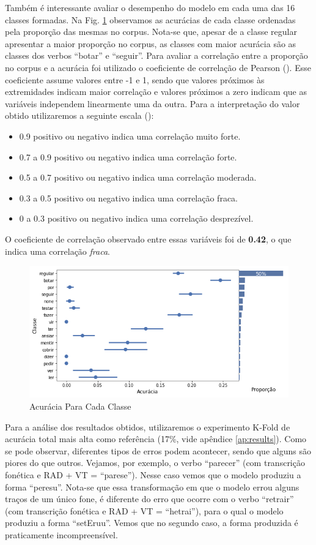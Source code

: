 Também é interessante avaliar o desempenho do modelo em cada uma das 16 classes formadas. Na Fig. \ref{fig:kfoldprop} observamos as acurácias de cada classe ordenadas pela proporção das mesmas no corpus. Nota-se que, apesar de a classe regular apresentar a maior proporção no corpus, as classes com maior acurácia são as classes dos verbos “botar” e “seguir”. Para avaliar a correlação entre a proporção no corpus e a acurácia foi utilizado o coeficiente de correlação de Pearson (\cite{2004:bussab}). Esse coeficiente assume valores entre -1 e 1, sendo que valores próximos às extremidades indicam maior correlação e valores próximos a zero indicam que as variáveis independem linearmente uma da outra. Para a interpretação do valor obtido utilizaremos a seguinte escala (\cite{pearson:1989}):

\begin{itemize}
    \item 0.9 positivo ou negativo indica uma correlação muito forte.
    \item0.7 a 0.9 positivo ou negativo indica uma correlação forte.
    \item0.5 a 0.7 positivo ou negativo indica uma correlação moderada.
    \item0.3 a 0.5 positivo ou negativo indica uma correlação fraca.
    \item0 a 0.3 positivo ou negativo indica uma correlação desprezível.
\end{itemize}

O coeficiente de correlação observado entre essas variáveis foi de \textbf{0.42}, o que indica uma correlação \textit{fraca}. 

\begin{figure}[H]
  \centering
  \includegraphics[width=0.8\linewidth]{img/proporxacc.png}
  \caption{Acurácia Para Cada Classe}
  \label{fig:kfoldprop}
\end{figure}

Para a análise dos resultados obtidos, utilizaremos o experimento K-Fold de acurácia total mais alta como referência (17\%, vide apêndice \ref{ap:results}). Como se pode observar, diferentes tipos de erros podem acontecer, sendo que alguns são piores do que outros. Vejamos, por exemplo, o verbo “parecer” (com transcrição fonética e RAD + VT = “parese”). Nesse caso vemos que o modelo produziu a forma “peresu”. Nota-se que essa transformação em que o modelo errou alguns traços de um único fone, é diferente do erro que ocorre com o verbo “retrair” (com transcrição fonética e RAD + VT = “hetrai”), para o qual o modelo produziu a forma “setEruu”. Vemos que no segundo caso, a forma produzida é praticamente incompreensível. %


